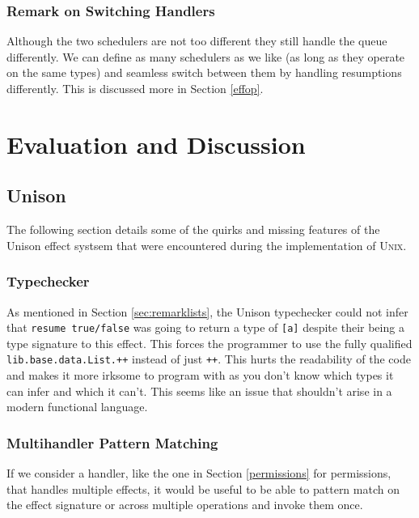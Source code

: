 \documentclass[logo,bsc,singlespacing,parskip]{infthesis}
\begin{document}
\subsection{Remark on Switching Handlers}

Although the two schedulers are not too different they still handle the queue
differently. We can define as many schedulers as we like (as long as they
operate on the same types) and seamless switch between them by handling
resumptions differently. This is discussed more in Section \ref{effop}.

\chapter{Evaluation and Discussion}

\section{Unison}

The following section details some of the quirks and missing features of the Unison
effect systsem that were encountered during the implementation of \textsc{Unix}.

\subsection{Typechecker}
\label{sec:typechecker}

As mentioned in Section \ref{sec:remarklists}, the Unison typechecker could not
infer that \texttt{resume true/false} was going to return a type of
\texttt{[a]} despite their being a type signature to this effect. This forces
the programmer to use the fully qualified \texttt{lib.base.data.List.++}
instead of just \texttt{++}. This hurts the readability of the code and makes
it more irksome to program with as you don't know which types it can infer and
which it can't. This seems like an issue that shouldn't arise in a modern
functional language.

\subsection{Multihandler Pattern Matching}
\label{multihandler}

If we consider a handler, like the one in Section \ref{permissions} for
permissions, that handles multiple effects, it would be useful to be able to
pattern match on the effect signature or across multiple operations and invoke
them once.
\end{document}
